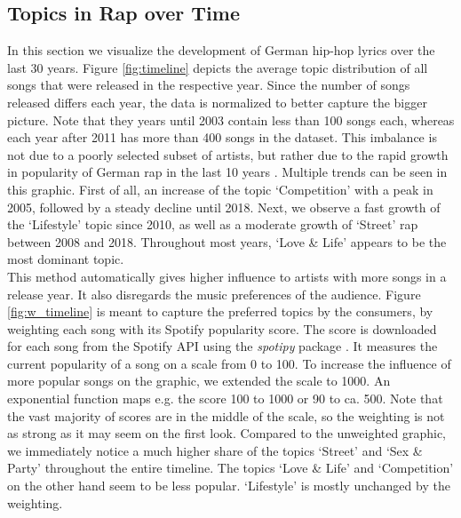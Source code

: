 \documentclass[conference]{IEEEtran}
\begin{document}
\subsection{Topics in Rap over Time}
In this section we visualize the development of German hip-hop lyrics over the last 30 years. Figure \ref{fig:timeline} depicts the average topic distribution of all songs that were released in the respective year. Since the number of songs released differs each year, the data is normalized to better capture the bigger picture. Note that they years until 2003 contain less than 100 songs each, whereas each year after 2011 has more than 400 songs in the dataset. This imbalance is not due to a poorly selected subset of artists, but rather due to the rapid growth in popularity of German rap in the last 10 years \cite{musikindustrie}. Multiple trends can be seen in this graphic. First of all, an increase of the topic {\lq}Competition{\rq} with a peak in 2005, followed by a steady decline until 2018. Next, we observe a fast growth of the {\lq}Lifestyle{\rq} topic since 2010, as well as a moderate growth of {\lq}Street{\rq} rap between 2008 and 2018. Throughout most years, {\lq}Love \& Life{\rq} appears to be the most dominant topic.\\
This method automatically gives higher influence to artists with more songs in a release year. It also disregards the music preferences of the audience. Figure \ref{fig:w_timeline} is meant to capture the preferred topics by the consumers, by weighting each song with its Spotify popularity score. The score is downloaded for each song from the Spotify API using the \textit{spotipy} package \cite{spotipy}. It measures the current popularity of a song on a scale from 0 to 100. To increase the influence of more popular songs on the graphic, we extended the scale to 1000. An exponential function maps e.g. the score 100 to 1000 or 90 to ca. 500. Note that the vast majority of scores are in the middle of the scale, so the weighting is not as strong as it may seem on the first look. Compared to the unweighted graphic, we immediately notice a much higher share of the topics {\lq}Street{\rq} and {\lq}Sex \& Party{\rq} throughout the entire timeline. The topics {\lq}Love \& Life{\rq} and {\lq}Competition{\rq} on the other hand seem to be less popular. {\lq}Lifestyle{\rq} is mostly unchanged by the weighting.
\end{document}
